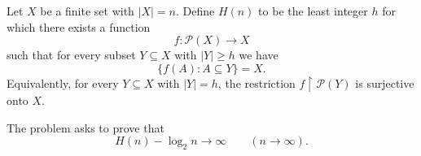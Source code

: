 Let $X$ be a finite set with $|X|=n$. Define $H(n)$ to be the least integer $h$ for which there exists a function
\[
 f:\mathcal P(X)\to X
\]
such that for every subset $Y\subseteq X$ with $|Y|\ge h$ we have
\[
\{f(A):A\subseteq Y\}=X.
\]
Equivalently, for every $Y\subseteq X$ with $|Y|=h$, the restriction $f\!\restriction\mathcal P(Y)$ is surjective onto $X$.

The problem asks to prove that
\[
H(n)-\log_2 n\to\infty\qquad (n\to\infty).
\]
